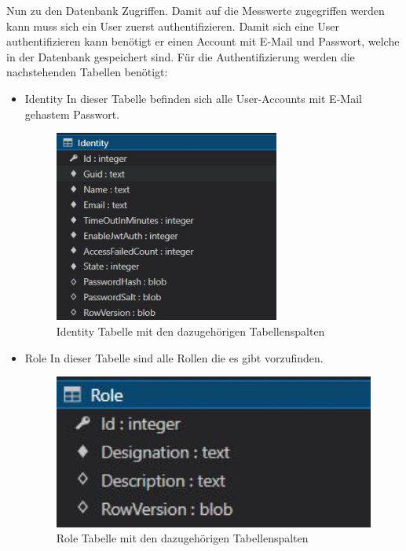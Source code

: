 Nun zu den Datenbank Zugriffen. Damit auf die Messwerte zugegriffen werden kann muss sich ein User zuerst authentifizieren.
Damit sich eine User authentifizieren kann benötigt er einen Account mit E-Mail und Passwort, welche in der Datenbank gespeichert sind.
Für die Authentifizierung werden die nachstehenden Tabellen benötigt:

\begin{itemize}
    \item Identity
    In dieser Tabelle befinden sich alle User-Accounts mit E-Mail gehastem Passwort.

    \begin{figure}[H]
        \centering
        \includegraphics[width=0.7\textwidth]{pics/IdentityTableStructur.JPG}
        \caption{Identity Tabelle mit den dazugehörigen Tabellenspalten}
    \end{figure}

\end{itemize}


\begin{itemize}
    \item Role
    In dieser Tabelle sind alle Rollen die es gibt vorzufinden.

    \begin{figure}[H]
        \centering
        \includegraphics[width=1\textwidth]{pics/RoleTableStructure.JPG}
        \caption{Role Tabelle mit den dazugehörigen Tabellenspalten}
    \end{figure}

\end{itemize}

